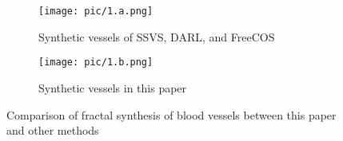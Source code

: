 \begin{figure}[htbp]
  \centering
  \begin{subfigure}[t]{0.2\textwidth}
      \centering
      \texttt{[image: pic/1.a.png]}
      \caption{Synthetic vessels of SSVS, DARL, and FreeCOS}
      \label{fig:my01a}
  \end{subfigure}
  \hspace{0.005\textwidth} %
  \begin{subfigure}[t]{0.2\textwidth}
      \centering
      \texttt{[image: pic/1.b.png]}
      \caption{Synthetic vessels in this paper}
      \label{fig:my01b}
  \end{subfigure}
  \caption{Comparison of fractal synthesis of blood vessels between this paper and other methods} %
  \label{fig:my01}
\end{figure}
